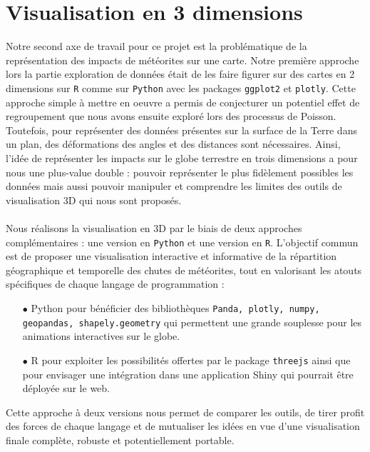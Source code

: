 \documentclass[12pt]{article}
\begin{document}
\section{Visualisation en 3 dimensions}
Notre second axe de travail pour ce projet est la problématique de la représentation des impacts de météorites sur une carte. Notre première approche lors la partie exploration de données était de les faire figurer sur des cartes en 2 dimensions sur \texttt{R} comme sur \texttt{Python} avec les packages \texttt{ggplot2} et \texttt{plotly}. Cette approche simple à mettre en oeuvre a permis de conjecturer un potentiel effet de regroupement que nous avons ensuite exploré lors des processus de Poisson. Toutefois, pour représenter des données présentes sur la surface de la Terre dans un plan, des déformations des angles et des distances sont nécessaires. Ainsi, l'idée de représenter les impacts sur le globe terrestre en trois dimensions a pour nous une plus-value double : pouvoir représenter le plus fidèlement possibles les données mais aussi pouvoir manipuler et comprendre les limites des outils de visualisation 3D qui nous sont proposés.\\
\\
Nous réalisons la visualisation en 3D par le biais de deux approches complémentaires : une version en \texttt{Python} et une version en \texttt{R}. L’objectif commun est de proposer une visualisation interactive et informative de la répartition géographique et temporelle des chutes de météorites, tout  en valorisant les atouts spécifiques de chaque langage de programmation :\\
\begin{itemize}
    \item[$\bullet$] Python pour bénéficier des bibliothèques \texttt{Panda, plotly, numpy, geopandas, shapely.geometry} qui permettent une grande souplesse pour les animations interactives sur le globe.
    \item[$\bullet$] R pour exploiter les possibilités offertes par le package \texttt{threejs} ainsi que pour envisager une intégration dans une application Shiny qui pourrait être déployée sur le web.
\end{itemize}
Cette approche à deux versions nous permet de comparer les outils, de tirer profit des forces de chaque langage et de mutualiser les idées en vue d’une visualisation finale complète, robuste et potentiellement portable.
\end{document}
